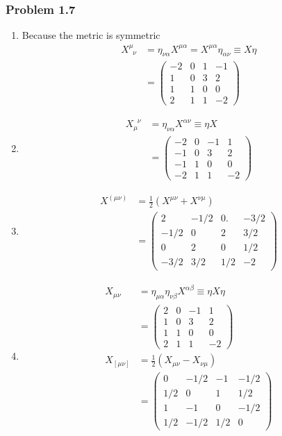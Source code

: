 \documentclass[10pt,a4paper]{article}
\theoremstyle{definition}
\begin{document}
\subsubsection{Problem 1.7}
\begin{enumerate}
\item Because the metric is symmetric
\begin{align}
 X^\mu_{\;\;\nu}&=\eta_{\nu\alpha}X^{\mu\alpha}=X^{\mu\alpha}\eta_{\alpha\nu}\equiv X\eta\\
 &=\begin{pmatrix}
-2 & 0 & 1 & -1\\
1 & 0 & 3 &  2\\
1 & 1 & 0 & 0\\
2 & 1 & 1 & -2
\end{pmatrix}
\end{align}

\item
\begin{align}
 X_\mu^{\;\;\nu}&=\eta_{\nu\alpha}X^{\alpha\nu}\equiv\eta X\\
 &=\begin{pmatrix}
-2 & 0 & -1 & 1\\
-1 & 0 & 3 &  2\\
-1 & 1 & 0 & 0\\
-2 & 1 & 1 & -2
\end{pmatrix}
\end{align}

\item 
\begin{align}
X^{(\mu\nu)}&=\frac{1}{2}(X^{\mu\nu}+X^{\nu\mu})\\
&=\begin{pmatrix}
2     & -1/2 & 0.  & -3/2\\
-1/2 & 0    & 2   &  3/2\\
0     & 2    & 0   & 1/2\\
-3/2 & 3/2 & 1/2 & -2
\end{pmatrix}
\end{align}

\item 
\begin{align}
X_{\mu\nu}&=\eta_{\mu\alpha}\eta_{\nu\beta}X^{\alpha\beta}\equiv\eta X\eta\\
&=\begin{pmatrix}
2 & 0 & -1 & 1\\
1 & 0 & 3 &  2\\
1 & 1 & 0 & 0\\
2 & 1 & 1 & -2
\end{pmatrix}\\
X_{[\mu\nu]}&=\frac{1}{2}(X_{\mu\nu}-X_{\nu\mu})\\
&=\begin{pmatrix}
0    & -1/2 & -1  & -1/2\\
1/2 & 0    & 1  &  1/2\\
1    & -1    & 0   & -1/2\\
1/2 & -1/2 & 1/2 & 0
\end{pmatrix}
\end{align}


\end{enumerate}
\end{document}
